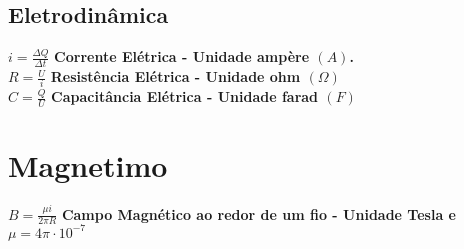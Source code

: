 \documentclass[
    12pt, %
    openright,
    twoside, %
    a4paper, %
    article,
    english,brazil %
]{abntex2}
\begin{document}
\subsection{Eletrodinâmica}

$i = \frac{\Delta Q}{\Delta t}$ \quad \textbf{Corrente Elétrica - Unidade ampère $(A)$.}\\
$R = \frac{U}{i}$ \quad \textbf{Resistência Elétrica - Unidade ohm $(\Omega)$} \\
$C = \frac{Q}{U}$ \quad \textbf{Capacitância Elétrica - Unidade farad $(F)$}

\section{Magnetimo}

$B = \frac{\mu i}{2\pi R}$ \quad \textbf{Campo Magnético ao redor de um fio - Unidade Tesla e $\mu=4\pi\cdot10^{-7}$} \\
\end{document}
